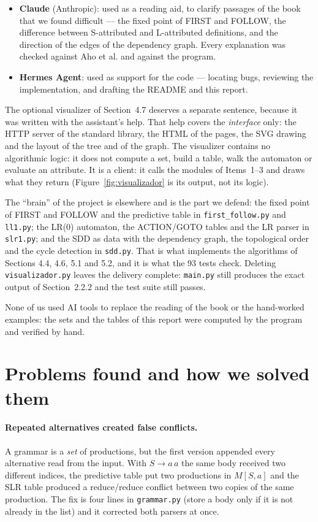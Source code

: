 \documentclass[11pt,letterpaper]{article}
\newcommand{\nt}[1]{\texttt{#1}}
\begin{document}
\begin{itemize}[leftmargin=1.1em,itemsep=2pt]
\item \textbf{Claude} (Anthropic): used as a reading aid, to clarify passages of the book that we
found difficult --- the fixed point of FIRST and FOLLOW, the difference between S-attributed and
L-attributed definitions, and the direction of the edges of the dependency graph. Every explanation
was checked against Aho et al. and against the program.
\item \textbf{Hermes Agent}: used as support for the code --- locating bugs, reviewing the
implementation, and drafting the README and this report.
\end{itemize}

The optional visualizer of Section~4.7 deserves a separate sentence, because it was written with the
assistant's help. That help covers the \emph{interface} only: the HTTP server of the standard library,
the HTML of the pages, the SVG drawing and the layout of the tree and of the graph. The visualizer
contains no algorithmic logic: it does not compute a set, build a table, walk the automaton or
evaluate an attribute. It is a client: it calls the modules of Items~1--3 and draws what they return
(Figure~\ref{fig:visualizador} is its output, not its logic).

The ``brain'' of the project is elsewhere and is the part we defend: the fixed point of FIRST and
FOLLOW and the predictive table in \nt{first\_follow.py} and \nt{ll1.py}; the LR(0) automaton, the
ACTION/GOTO tables and the LR parser in \nt{slr1.py}; and the SDD as data with the dependency graph,
the topological order and the cycle detection in \nt{sdd.py}. That is what implements the algorithms
of Sections 4.4, 4.6, 5.1 and 5.2, and it is what the 93 tests check. Deleting
\nt{visualizador.py} leaves the delivery complete: \nt{main.py} still produces the exact output of
Section~2.2.2 and the test suite still passes.

None of us used AI tools to replace the reading of the book or the hand-worked examples: the sets and
the tables of this report were computed by the program and verified by hand.

\section{Problems found and how we solved them}

\paragraph{Repeated alternatives created false conflicts.} A grammar is a \emph{set} of
productions, but the first version appended every alternative read from the input. With $S \to a\,a$
the same body received two different indices, the predictive table put two productions in
$M[S,a]$ and the SLR table produced a reduce/reduce conflict between two copies of the same
production. The fix is four lines in \nt{grammar.py} (store a body only if it is not already in the
list) and it corrected both parsers at once.
\end{document}

